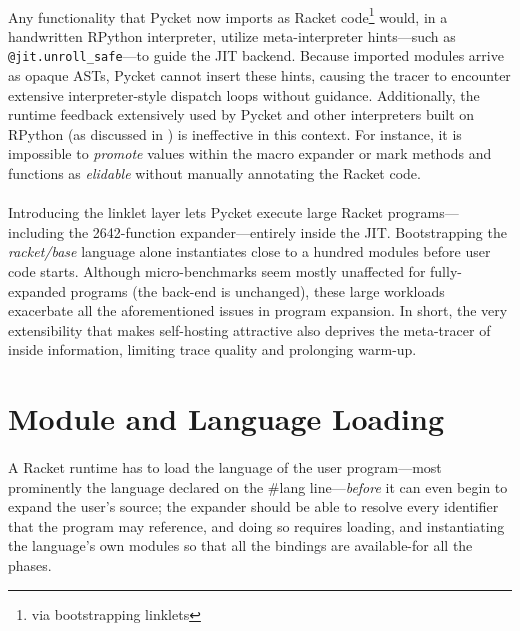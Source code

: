 	\paragraph{}%
		Any functionality that Pycket now imports as Racket code\footnote{via bootstrapping linklets} would, in a handwritten RPython interpreter, utilize meta-interpreter hints—such as \verb|@jit.unroll_safe|—to guide the JIT backend. Because imported modules arrive as opaque ASTs, Pycket cannot insert these hints, causing the tracer to encounter extensive interpreter-style dispatch loops without guidance. Additionally, the runtime feedback extensively used by Pycket and other interpreters built on RPython (as discussed in ) is ineffective in this context. For instance, it is impossible to \emph{promote} values within the macro expander or mark methods and functions as \emph{elidable} without manually annotating the Racket code.

	\paragraph{}%
		Introducing the linklet layer lets Pycket execute large Racket programs—including the 2642-function expander—entirely inside the JIT. Bootstrapping the \emph{racket/base} language alone instantiates close to a hundred modules before user code starts. Although micro-benchmarks seem mostly unaffected for fully-expanded programs (the back-end is unchanged), these large workloads exacerbate all the aforementioned issues in program expansion. In short, the very extensibility that makes self-hosting attractive also deprives the meta-tracer of inside information, limiting trace quality and prolonging warm-up.

	\section[\texorpdfstring{Module and Language Loading}{Loading a Language}]{Module and Language Loading}
	\label{section:module-and-language-loading}


		\paragraph{}%
			A Racket runtime has to load the language of the user program—most prominently the language declared on the \#lang line—\emph{before} it can even begin to expand the user's source; the expander should be able to resolve every identifier that the program may reference, and doing so requires loading, and instantiating the language's own modules so that all the bindings are available-for all the phases.


